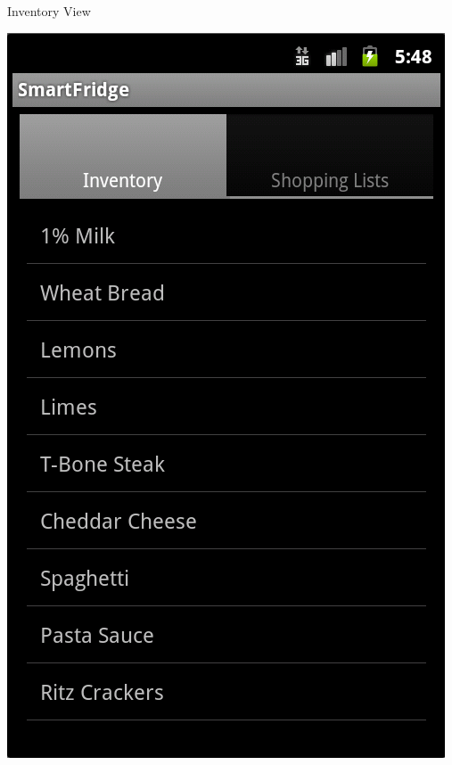\documentclass[t]{beamer}
\begin{document}
\begin{frame}{Inventory View}
    \begin{center}
        \includegraphics[scale=0.4]{../Graphics/Inventory.PNG}
    \end{center}
\end{frame}
\end{document}

